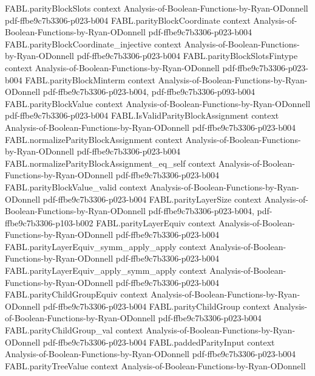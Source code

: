 \begin{theorem}
\proofstep
  {FABL.parityBlockSlots}
  {context}
  {Analysis-of-Boolean-Functions-by-Ryan-ODonnell}
  {pdf-ffbe9c7b3306-p023-b004}
\proofstep
  {FABL.parityBlockCoordinate}
  {context}
  {Analysis-of-Boolean-Functions-by-Ryan-ODonnell}
  {pdf-ffbe9c7b3306-p023-b004}
\proofstep
  {FABL.parityBlockCoordinate_injective}
  {context}
  {Analysis-of-Boolean-Functions-by-Ryan-ODonnell}
  {pdf-ffbe9c7b3306-p023-b004}
\proofstep
  {FABL.parityBlockSlotsFintype}
  {context}
  {Analysis-of-Boolean-Functions-by-Ryan-ODonnell}
  {pdf-ffbe9c7b3306-p023-b004}
\proofstep
  {FABL.parityBlockMinterm}
  {context}
  {Analysis-of-Boolean-Functions-by-Ryan-ODonnell}
  {pdf-ffbe9c7b3306-p023-b004,
    pdf-ffbe9c7b3306-p093-b004}
\proofstep
  {FABL.parityBlockValue}
  {context}
  {Analysis-of-Boolean-Functions-by-Ryan-ODonnell}
  {pdf-ffbe9c7b3306-p023-b004}
\proofstep
  {FABL.IsValidParityBlockAssignment}
  {context}
  {Analysis-of-Boolean-Functions-by-Ryan-ODonnell}
  {pdf-ffbe9c7b3306-p023-b004}
\proofstep
  {FABL.normalizeParityBlockAssignment}
  {context}
  {Analysis-of-Boolean-Functions-by-Ryan-ODonnell}
  {pdf-ffbe9c7b3306-p023-b004}
\proofstep
  {FABL.normalizeParityBlockAssignment_eq_self}
  {context}
  {Analysis-of-Boolean-Functions-by-Ryan-ODonnell}
  {pdf-ffbe9c7b3306-p023-b004}
\proofstep
  {FABL.parityBlockValue_valid}
  {context}
  {Analysis-of-Boolean-Functions-by-Ryan-ODonnell}
  {pdf-ffbe9c7b3306-p023-b004}
\proofstep
  {FABL.parityLayerSize}
  {context}
  {Analysis-of-Boolean-Functions-by-Ryan-ODonnell}
  {pdf-ffbe9c7b3306-p023-b004,
    pdf-ffbe9c7b3306-p103-b002}
\proofstep
  {FABL.parityLayerEquiv}
  {context}
  {Analysis-of-Boolean-Functions-by-Ryan-ODonnell}
  {pdf-ffbe9c7b3306-p023-b004}
\proofstep
  {FABL.parityLayerEquiv_symm_apply_apply}
  {context}
  {Analysis-of-Boolean-Functions-by-Ryan-ODonnell}
  {pdf-ffbe9c7b3306-p023-b004}
\proofstep
  {FABL.parityLayerEquiv_apply_symm_apply}
  {context}
  {Analysis-of-Boolean-Functions-by-Ryan-ODonnell}
  {pdf-ffbe9c7b3306-p023-b004}
\proofstep
  {FABL.parityChildGroupEquiv}
  {context}
  {Analysis-of-Boolean-Functions-by-Ryan-ODonnell}
  {pdf-ffbe9c7b3306-p023-b004}
\proofstep
  {FABL.parityChildGroup}
  {context}
  {Analysis-of-Boolean-Functions-by-Ryan-ODonnell}
  {pdf-ffbe9c7b3306-p023-b004}
\proofstep
  {FABL.parityChildGroup_val}
  {context}
  {Analysis-of-Boolean-Functions-by-Ryan-ODonnell}
  {pdf-ffbe9c7b3306-p023-b004}
\proofstep
  {FABL.paddedParityInput}
  {context}
  {Analysis-of-Boolean-Functions-by-Ryan-ODonnell}
  {pdf-ffbe9c7b3306-p023-b004}
\proofstep
  {FABL.parityTreeValue}
  {context}
  {Analysis-of-Boolean-Functions-by-Ryan-ODonnell}

\end{theorem}

